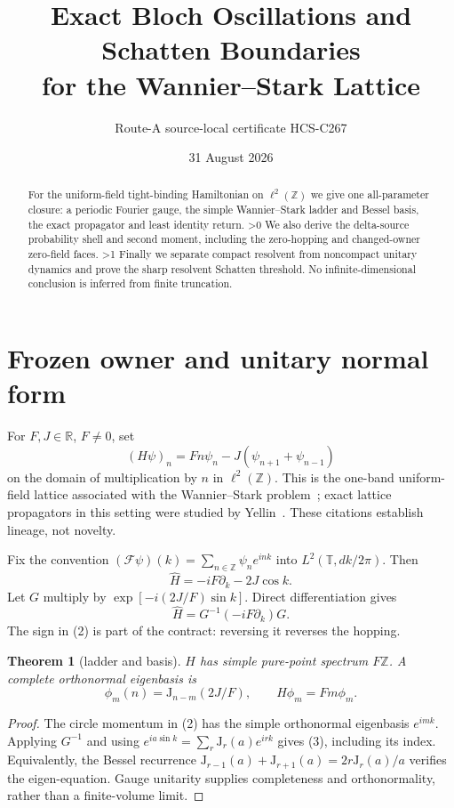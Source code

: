 \documentclass[10pt]{article}
\title{Exact Bloch Oscillations and Schatten Boundaries\\for the Wannier--Stark Lattice}
\author{Route-A source-local certificate HCS-C267}
\date{31 August 2026}
\providecommand{\CRevisionRound}{2}
\newtheorem{theorem}{Theorem}
\newcommand{\T}{\mathbb T}
\newcommand{\Z}{\mathbb Z}
\newcommand{\Fcal}{\mathcal F}
\begin{document}
\maketitle
\begin{abstract}
For the uniform-field tight-binding Hamiltonian on $\ell^2(\Z)$ we give one
all-parameter closure: a periodic Fourier gauge, the simple Wannier--Stark
ladder and Bessel basis, the exact propagator and least identity return.
\ifnum\CRevisionRound>0 We also derive the delta-source probability shell and
second moment, including the zero-hopping and changed-owner zero-field faces.\fi\space
\ifnum\CRevisionRound>1 Finally we separate compact resolvent from noncompact
unitary dynamics and prove the sharp resolvent Schatten threshold.\fi\space
No infinite-dimensional conclusion is inferred from finite truncation.
\end{abstract}

\section{Frozen owner and unitary normal form}
For $F,J\in\mathbb R$, $F\ne0$, set
\begin{equation}
 (H\psi)_n=Fn\psi_n-J(\psi_{n+1}+\psi_{n-1})                 \tag{1}
\end{equation}
on the domain of multiplication by $n$ in $\ell^2(\Z)$.  This is the
one-band uniform-field lattice associated with the Wannier--Stark
problem~\cite{Wannier}; exact lattice propagators in this setting were studied
by Yellin~\cite{Yellin}.  These citations establish lineage, not novelty.

Fix the convention
$(\Fcal\psi)(k)=\sum_{n\in\Z}\psi_ne^{ink}$ into
$L^2(\T,dk/2\pi)$.  Then
\[
 \widehat H=-iF\partial_k-2J\cos k.
\]
Let $G$ multiply by $\exp[-i(2J/F)\sin k]$.  Direct differentiation gives
\begin{equation}
 \widehat H=G^{-1}(-iF\partial_k)G.                         \tag{2}
\end{equation}
The sign in (2) is part of the contract: reversing it reverses the hopping.

\begin{theorem}[ladder and basis]
$H$ has simple pure-point spectrum $F\Z$.  A complete orthonormal eigenbasis is
\begin{equation}
 \phi_m(n)=\mathrm J_{n-m}(2J/F),\qquad H\phi_m=Fm\phi_m.   \tag{3}
\end{equation}
\end{theorem}
\begin{proof}
The circle momentum in (2) has the simple orthonormal eigenbasis $e^{imk}$.
Applying $G^{-1}$ and using
$e^{ia\sin k}=\sum_r\mathrm J_r(a)e^{irk}$ gives (3), including its index.
Equivalently, the Bessel recurrence
$\mathrm J_{r-1}(a)+\mathrm J_{r+1}(a)=2r\mathrm J_r(a)/a$
verifies the eigen-equation.  Gauge unitarity supplies completeness and
orthonormality, rather than a finite-volume limit.
\end{proof}
\end{document}
